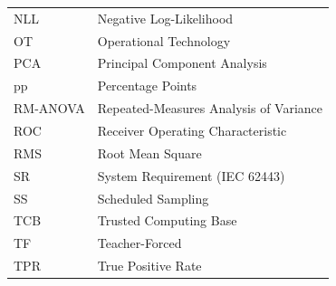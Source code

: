 \documentclass[sensors,article,submit,moreauthors,pdftex]{Definitions/mdpi}
\begin{document}
{\begin{tabular}{@{}ll}
NLL        & Negative Log-Likelihood \\
OT         & Operational Technology \\
PCA        & Principal Component Analysis \\
pp         & Percentage Points \\
RM-ANOVA   & Repeated-Measures Analysis of Variance \\
ROC        & Receiver Operating Characteristic \\
RMS        & Root Mean Square \\
SR         & System Requirement (IEC 62443) \\
SS         & Scheduled Sampling \\
TCB        & Trusted Computing Base \\
TF         & Teacher-Forced \\
TPR        & True Positive Rate \\
\end{tabular}
}


\end{document}
